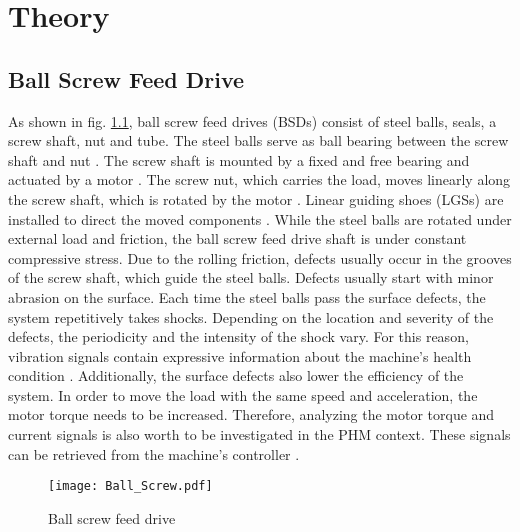\chapter{Theory}\label{chapter:theory}

\section{Ball Screw Feed Drive}
As shown in fig. \ref{fig:Ball_Screw}, ball screw feed drives (BSDs) consist of steel balls, seals, a screw shaft, nut and tube. The steel balls serve as ball bearing between the screw shaft and nut \cite{Lee2015}. The screw shaft is mounted by a fixed and free bearing and actuated by a motor \cite{DENG2020}. The screw nut, which carries the load, moves linearly along the screw shaft, which is rotated by the motor \cite{Lee2015}. Linear guiding shoes (LGSs) are installed to direct the moved components \cite{DENG2020}. While the steel balls are rotated under external load and friction, the ball screw feed drive shaft is under constant compressive stress. Due to the rolling friction, defects usually occur in the grooves of the screw shaft, which guide the steel balls. Defects usually start with minor abrasion on the surface. Each time the steel balls pass the surface defects, the system repetitively takes shocks. Depending on the location and severity of the defects, the periodicity and the intensity of the shock vary. For this reason, vibration signals contain expressive information about the machine's health condition \cite{Lee2015}. Additionally, the surface defects also lower the efficiency of the system. In order to move the load with the same speed and acceleration, the motor torque needs to be increased. Therefore, analyzing the motor torque and current signals is also worth to be investigated in the PHM context. These signals can be retrieved from the machine's controller \cite{AZAMFAR2020103932}.

\begin{figure}[H]
  \centering
  \texttt{[image: Ball\_Screw.pdf]}
  \caption {Ball screw feed drive \cite{DENG2020}} \label{fig:Ball_Screw}
\end{figure}

